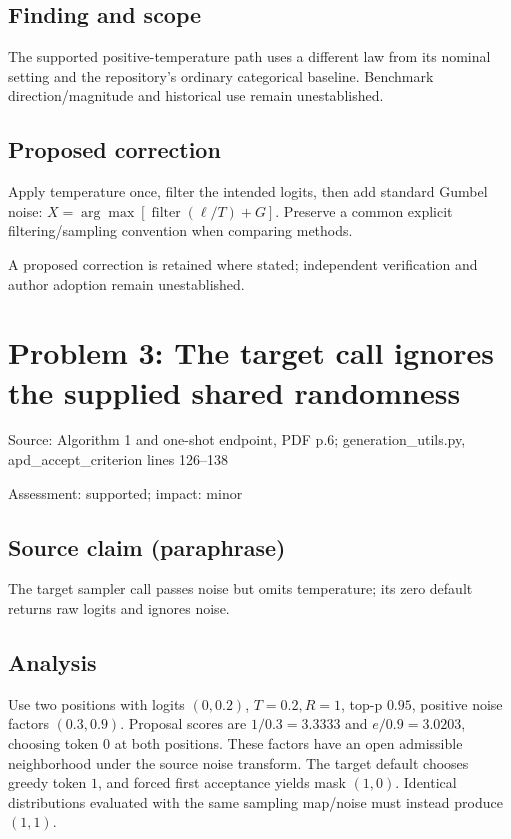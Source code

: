 \documentclass[11pt]{article}
\begin{document}
\subsection*{Finding and scope}

The supported positive-temperature path uses a different law from its nominal setting and the repository’s ordinary categorical baseline. Benchmark direction/magnitude and historical use remain unestablished.

\subsection*{Proposed correction}

Apply temperature once, filter the intended logits, then add standard Gumbel noise: \(X=\arg\max[\operatorname{filter}(\ell/T)+G]\). Preserve a common explicit filtering/sampling convention when comparing methods.

A proposed correction is retained where stated; independent verification and author adoption remain unestablished.

\section*{Problem 3: The target call ignores the supplied shared randomness}

Source: Algorithm 1 and one-shot endpoint, PDF p.6; generation\_utils.py, apd\_accept\_criterion lines 126–138

Assessment: supported; impact: minor

\subsection*{Source claim (paraphrase)}

The target sampler call passes noise but omits temperature; its zero default returns raw logits and ignores noise.

\subsection*{Analysis}

Use two positions with logits \((0,0.2)\), \(T=0.2,R=1\), top-p \(0.95\), positive noise factors \((0.3,0.9)\). Proposal scores are \(1/0.3=3.3333\) and \(e/0.9=3.0203\), choosing token \(0\) at both positions. These factors have an open admissible neighborhood under the source noise transform. The target default chooses greedy token \(1\), and forced first acceptance yields mask \((1,0)\). Identical distributions evaluated with the same sampling map/noise must instead produce \((1,1)\).
\end{document}
